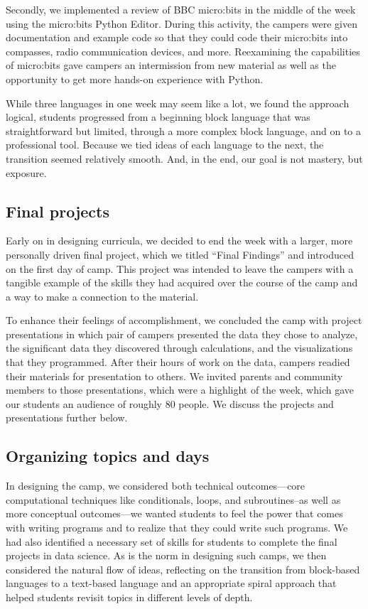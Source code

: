 Secondly, we implemented a review of BBC micro:bits in the middle
of the week using the micro:bits Python Editor. During this activity,
the campers were given documentation and example code so that they
could code their micro:bits into compasses, radio communication
devices, and more. Reexamining the capabilities of micro:bits gave
campers an intermission from new material as well as the opportunity
to get more hands-on experience with Python.

While three languages in one week may seem like a lot, we found the
approach logical, students progressed from a beginning block language 
that was straightforward but limited, through a more complex block
language, and on to a professional tool.  Because we tied ideas of
each language to the next, the transition seemed relatively smooth.
And, in the end, our goal is not mastery, but exposure.

\subsection{Final projects}

Early on in designing curricula, we decided to end the week with a
larger, more personally driven final project, which we titled ``Final
Findings'' and introduced on the first day of camp.  This project
was intended to leave the campers with a tangible example of the
skills they had acquired over the course of the camp and a way to
make a connection to the material.

To enhance their feelings of accomplishment, we concluded the camp
with project presentations in which pair of campers presented the
data they chose to analyze, the significant data they discovered
through calculations, and the visualizations that they programmed.
After their hours of work on the data, campers readied their materials
for presentation to others.  We invited parents and community members
to those presentations, which were a highlight of the week, which
gave our students an audience of roughly 80 people.  We discuss the
projects and presentations further below.

\subsection{Organizing topics and days}

In designing the camp, we considered both technical outcomes---core
computational techniques like conditionals, loops, and subroutines--as
well as more conceptual outcomes---we wanted students to feel the
power that comes with writing programs and to realize that they
could write such programs.  We had also identified a necessary set
of skills for students to complete the final projects in data
science.  As is the norm in designing such camps, we then considered
the natural flow of ideas, reflecting on the transition from
block-based languages to a text-based language and an appropriate
spiral approach that helped students revisit topics in different
levels of depth.

